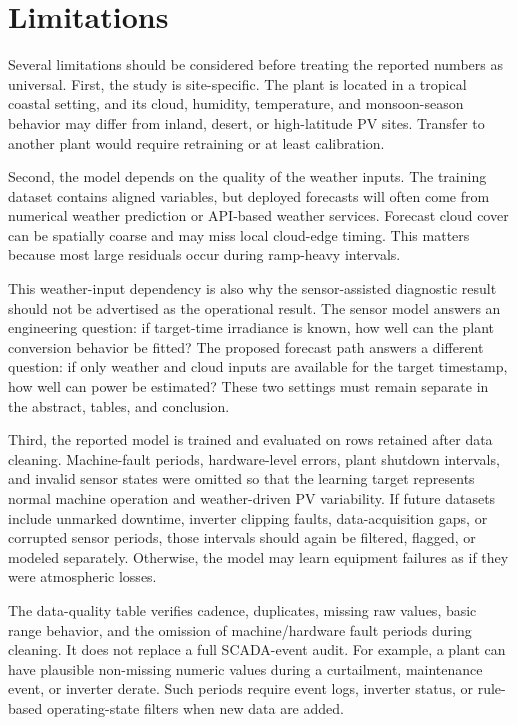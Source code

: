 \section{Limitations}
\label{sec:limitations}

Several limitations should be considered before treating the reported numbers as universal. First, the study is site-specific. The plant is located in a tropical coastal setting, and its cloud, humidity, temperature, and monsoon-season behavior may differ from inland, desert, or high-latitude PV sites. Transfer to another plant would require retraining or at least calibration.

Second, the model depends on the quality of the weather inputs. The training dataset contains aligned variables, but deployed forecasts will often come from numerical weather prediction or API-based weather services. Forecast cloud cover can be spatially coarse and may miss local cloud-edge timing. This matters because most large residuals occur during ramp-heavy intervals.

This weather-input dependency is also why the sensor-assisted diagnostic result should not be advertised as the operational result. The sensor model answers an engineering question: if target-time irradiance is known, how well can the plant conversion behavior be fitted? The proposed forecast path answers a different question: if only weather and cloud inputs are available for the target timestamp, how well can power be estimated? These two settings must remain separate in the abstract, tables, and conclusion.

Third, the reported model is trained and evaluated on rows retained after data cleaning. Machine-fault periods, hardware-level errors, plant shutdown intervals, and invalid sensor states were omitted so that the learning target represents normal machine operation and weather-driven PV variability. If future datasets include unmarked downtime, inverter clipping faults, data-acquisition gaps, or corrupted sensor periods, those intervals should again be filtered, flagged, or modeled separately. Otherwise, the model may learn equipment failures as if they were atmospheric losses.

The data-quality table verifies cadence, duplicates, missing raw values, basic range behavior, and the omission of machine/hardware fault periods during cleaning. It does not replace a full SCADA-event audit. For example, a plant can have plausible non-missing numeric values during a curtailment, maintenance event, or inverter derate. Such periods require event logs, inverter status, or rule-based operating-state filters when new data are added.

